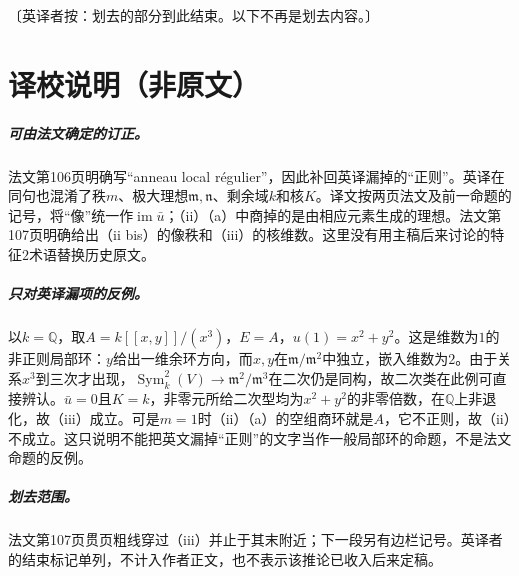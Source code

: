 \documentclass[openany,fontset=fandol]{ctexbook}
\newcommand{\im}{\operatorname{im}}
\newcommand{\Sym}{\operatorname{Sym}}
\newcommand{\m}{\mathfrak m}
\newcommand{\n}{\mathfrak n}
\begin{document}
\noindent〔英译者按：划去的部分到此结束。以下不再是划去内容。〕
\chapter*{译校说明（非原文）}
\paragraph{可由法文确定的订正。}
法文第106页明确写“anneau local régulier”，因此补回英译漏掉的“正则”。英译在同句也混淆了秩$m$、极大理想$\m,\n$、剩余域$k$和核$K$。译文按两页法文及前一命题的记号，将“像”统一作$\im\bar u$；（ii）（a）中商掉的是由相应元素生成的理想。法文第107页明确给出（ii bis）的像秩和（iii）的核维数。这里没有用主稿后来讨论的特征$2$术语替换历史原文。

\paragraph{只对英译漏项的反例。}
以$k=\mathbb Q$，取$A=k[[x,y]]/(x^3)$，$E=A$，$u(1)=x^2+y^2$。这是维数为$1$的非正则局部环：$y$给出一维余环方向，而$x,y$在$\m/\m^2$中独立，嵌入维数为$2$。由于关系$x^3$到三次才出现，$\Sym_k^2(V)\to\m^2/\m^3$在二次仍是同构，故二次类在此例可直接辨认。$\bar u=0$且$K=k$，非零元所给二次型均为$x^2+y^2$的非零倍数，在$\mathbb Q$上非退化，故（iii）成立。可是$m=1$时（ii）（a）的空组商环就是$A$，它不正则，故（ii）不成立。这只说明不能把英文漏掉“正则”的文字当作一般局部环的命题，不是法文命题的反例。

\paragraph{划去范围。}
法文第107页贯页粗线穿过（iii）并止于其末附近；下一段另有边栏记号。英译者的结束标记单列，不计入作者正文，也不表示该推论已收入后来定稿。
\end{document}
